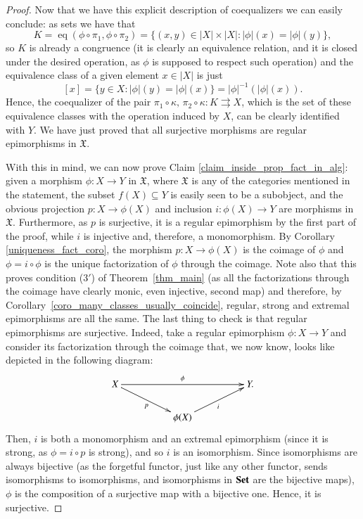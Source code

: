 \documentclass[12pt]{article}
\theoremstyle{definition}
\def\X{\mathfrak X}
\newcommand{\Set}{\textbf{\textup{Set}}}
\DeclareMathOperator{\eq}{eq}
\numberwithin{equation}{section}
\begin{document}
\begin{proof}
Now that we have this explicit description of coequalizers we can easily conclude: as sets we have that
\[
K=\eq(\phi\circ\pi_1,\phi\circ\pi_2)=\{(x,y)\in |X|\times |X|: |\phi|(x)=|\phi|(y)\},
\]
so $K$ is already a congruence (it is clearly an equivalence relation, and it is closed under the desired operation, as $\phi$ is supposed to respect such operation) and the equivalence class of a given element $x\in |X|$ is just 
\[
[x]=\{y\in X:|\phi|(y)=|\phi|(x)\}=|\phi|^{-1}(|\phi|(x)).
\] 
Hence, the coequalizer of the pair $\pi_1\circ\kappa,\, \pi_2\circ \kappa\colon K\rightrightarrows X$, which is the set of these equivalence classes with the operation induced by $X$, can be clearly identified with $Y$. We have just proved that all surjective morphisms are regular epimorphisms in $\X$.

With this in mind, we can now prove Claim \ref{claim_inside_prop_fact_in_alg}: given a morphism $\phi\colon X\to Y$ in $\X$, where $\X$ is any of the categories mentioned in the statement, the subset $f(X)\subseteq Y$ is easily seen to be a subobject, and the obvious projection $p\colon X\to \phi(X)$ and inclusion $i\colon \phi(X)\to Y$ are morphisms in $\X$. Furthermore, as $p$ is surjective, it is a regular epimorphism by the first part of the proof, while $i$ is injective and, therefore, a monomorphism. By Corollary \ref{uniqueness_fact_coro}, the morphism $p\colon X\to \phi(X)$ is the coimage of $\phi$ and $\phi=i\circ \phi$ is the unique factorization of $\phi$ through the coimage. Note also that this proves condition (3$'$) of Theorem~\ref{thm_main}  (as all the factorizations through the coimage have clearly monic, even injective, second map) and therefore, by Corollary~\ref{coro_many_classes_usually_coincide}, regular, strong and extremal epimorphisms are all the same. The last thing to check is that regular epimorphisms are surjective. Indeed, take a regular epimorphism $\phi\colon X\to Y$ and consider its factorization through the coimage that, we now know, looks like depicted in the following diagram:
\[
\xymatrix@R=20pt@C=50pt{
X\ar[rr]^{\phi}\ar[dr]_p&&Y.\\
&\phi(X)\ar[ur]_i
}
\] 
Then, $i$ is both a monomorphism and an extremal epimorphism (since it is strong, as $\phi=i\circ p$ is strong), and so $i$ is an isomorphism. Since isomorphisms are always bijective (as the forgetful functor, just like any other functor, sends isomorphisms to isomorphisms, and isomorphisms in $\Set$ are the bijective maps), $\phi$ is the composition of a surjective map with a bijective one. Hence, it is surjective.
\end{proof}
\fi 
\end{document}
